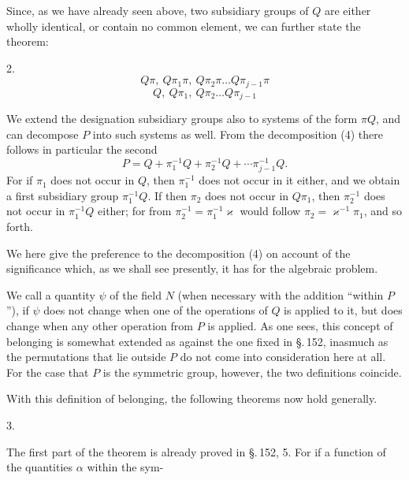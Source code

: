 
Since, as we have already seen above, two subsidiary groups of $Q$ are either wholly identical, or contain no common element, we can further state the theorem:

2. 
\[
Q\pi,\ Q\pi_1\pi,\ Q\pi_2\pi\ldots Q\pi_{j-1}\pi
\]
\[
Q,\ Q\pi_1,\ Q\pi_2\ldots Q\pi_{j-1}
\]

We extend the designation subsidiary groups also to systems of the form $\pi Q$, and can decompose $P$ into such systems as well. From the decomposition (4) there follows in particular the second
\[
P = Q + \pi_1^{-1}Q + \pi_2^{-1}Q + \cdots \pi_{j-1}^{-1}Q.
\]
For if $\pi_1$ does not occur in $Q$, then $\pi_1^{-1}$ does not occur in it either, and we obtain a first subsidiary group $\pi_1^{-1}Q$. If then $\pi_2$ does not occur in $Q\pi_1$, then $\pi_2^{-1}$ does not occur in $\pi_1^{-1}Q$ either; for from $\pi_2^{-1} = \pi_1^{-1}\varkappa$ would follow $\pi_2 = \varkappa^{-1}\pi_1$, and so forth.

We here give the preference to the decomposition (4) on account of the significance which, as we shall see presently, it has for the algebraic problem.

We call a quantity $\psi$ of the field $N$  (when necessary with the addition ``within $P$''), if $\psi$ does not change when one of the operations of $Q$ is applied to it, but does change when any other operation from $P$ is applied. As one sees, this concept of belonging is somewhat extended as against the one fixed in \S.\,152, inasmuch as the permutations that lie outside $P$ do not come into consideration here at all. For the case that $P$ is the symmetric group, however, the two definitions coincide.

With this definition of belonging, the following theorems now hold generally.

3. 

The first part of the theorem is already proved in \S.\,152, 5. For if a function of the quantities $\alpha$ within the sym-
